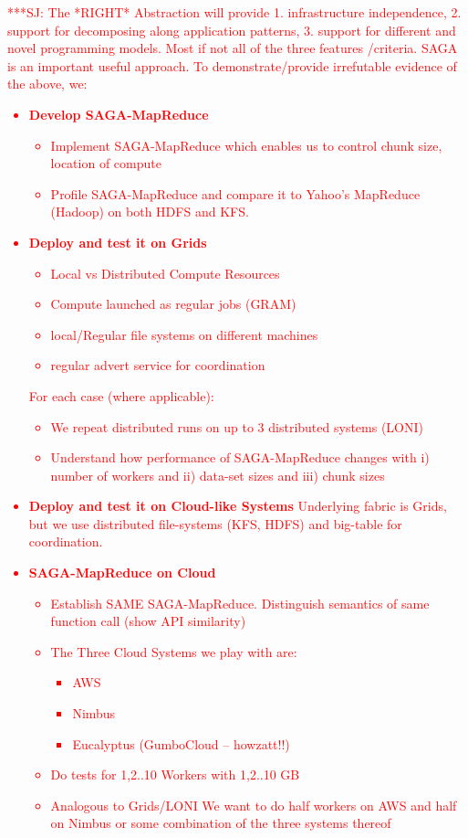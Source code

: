 \documentclass[conference,final]{IEEEtran}
\newcommand{\jhanote}[1]{ {\textcolor{red} { ***SJ: #1 }}}
\newcommand{\jhanote}[1]{}
\begin{document}
\jhanote{The *RIGHT* Abstraction will provide 1. infrastructure
  independence, 2. support for decomposing along application patterns,
  3. support for different and novel programming models. Most if not
  all of the three features /criteria. SAGA is an important useful
  approach.  To demonstrate/provide irrefutable evidence of the above,
  we:

\begin{itemize}
\item {\bf Develop SAGA-MapReduce }

  \begin{itemize}
  \item Implement SAGA-MapReduce which enables us to control chunk
    size, location of compute
  \item Profile SAGA-MapReduce and compare it to Yahoo's MapReduce
    (Hadoop) on both HDFS and KFS.
  \end{itemize}

\item {\bf Deploy and test it on Grids}
  \begin{itemize}
  \item Local vs Distributed Compute Resources
  \item Compute launched as regular jobs (GRAM)
  \item local/Regular file systems on different machines
  \item regular advert service for coordination
  \end{itemize}

For each case (where applicable):
  \begin{itemize}
  \item We repeat distributed runs on up to 3 distributed systems
    (LONI)
  \item Understand how performance of SAGA-MapReduce changes with i)
    number of workers and ii) data-set sizes and iii) chunk sizes
  \end{itemize}

\item {\bf Deploy and test it on Cloud-like Systems} Underlying fabric
  is Grids, but we use distributed file-systems (KFS, HDFS) and
  big-table for coordination.
\item {\bf SAGA-MapReduce on Cloud}
  \begin{itemize}
  \item Establish SAME SAGA-MapReduce. Distinguish semantics of same
    function call (show API similarity)
  \item The Three Cloud Systems we play with are:
    \begin{itemize}
    \item AWS
    \item Nimbus
    \item Eucalyptus (GumboCloud -- howzatt!!)
    \end{itemize}
  \item Do tests for 1,2..10 Workers with 1,2..10 GB
  \item Analogous to Grids/LONI We want to do half workers on AWS and
    half on Nimbus or some combination of the three systems thereof
  \end{itemize}
\end{itemize}

}
\end{document}
